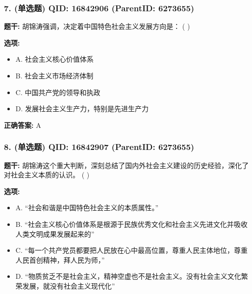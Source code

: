 \documentclass[12pt,UTF8]{ctexart}
\begin{document}
\vspace{0.3em}\hrulefill\vspace{0.7em}

\subsubsection*{7. (单选题) \small QID: 16842906 (ParentID: 6273655)}

\textbf{题干:}
胡锦涛强调，决定着中国特色社会主义发展方向是： ( )



\textbf{选项:}
\begin{itemize}[leftmargin=*]

  \item A. 社会主义核心价值体系

  \item B. 社会主义市场经济体制

  \item C. 中国共产党的领导和执政

  \item D. 发展社会主义生产力，特别是先进生产力

\end{itemize}

\textbf{正确答案:}
A

\vspace{0.3em}\hrulefill\vspace{0.7em}

\subsubsection*{8. (单选题) \small QID: 16842907 (ParentID: 6273655)}

\textbf{题干:}
胡锦涛这个重大判断，深刻总结了国内外社会主义建设的历史经验，深化了对社会主义本质的认识。 ( )



\textbf{选项:}
\begin{itemize}[leftmargin=*]

  \item A. “社会和谐是中国特色社会主义的本质属性。”

  \item B. “社会主义核心价值体系是根源于民族优秀文化和社会主义先进文化并吸收人类文明成果发展起来的”

  \item C. “每一个共产党员都要把人民放在心中最高位置，尊重人民主体地位，尊重人民首创精神，拜人民为师，”

  \item D. “物质贫乏不是社会主义，精神空虚也不是社会主义。没有社会主义文化繁荣发展，就没有社会主义现代化”

\end{itemize}
\end{document}

